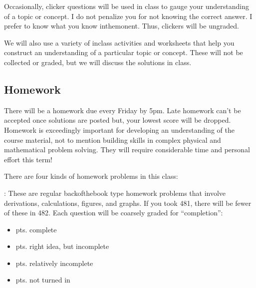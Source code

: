 \documentclass[letterpaper,10pt,english]{jupyterBook}
\begin{document}
\sphinxAtStartPar
{} Occasionally, clicker questions will be used in class to gauge your understanding of a topic or concept. I do not penalize you for not knowing the correct answer. I prefer to know what you know in\sphinxhyphen{}the\sphinxhyphen{}monent. Thus, clickers will be ungraded.

\sphinxAtStartPar
{} We will also use a variety of in\sphinxhyphen{}class activities and worksheets that help you construct an understanding of a particular topic or concept. These will not be collected or graded, but we will discuss the solutions in class.


\subsection{Homework}
\label{\detokenize{content/0_course/design:homework}}
\sphinxAtStartPar
There will be a homework due every Friday by 5pm. Late homework can’t be accepted once solutions are posted \sphinxhyphen{} but, your lowest score will be dropped. Homework is exceedingly important for developing an understanding of the course material, not to mention building skills in complex physical and mathematical problem solving. They will require considerable time and personal effort this term! 

\sphinxAtStartPar
There are four kinds of homework problems in this class:

\sphinxAtStartPar
{}: These are regular back\sphinxhyphen{}of\sphinxhyphen{}the\sphinxhyphen{}book type homework problems that involve derivations, calculations, figures, and graphs. If you took 481, there will be fewer of these in 482. Each question will be coarsely graded for “completion”:
\begin{itemize}
\item {} 
 pts. complete

\item {} 
 pts. right idea, but incomplete

\item {} 
 pts. relatively incomplete

\item {} 
 pts. not turned in

\end{itemize}
\end{document}
